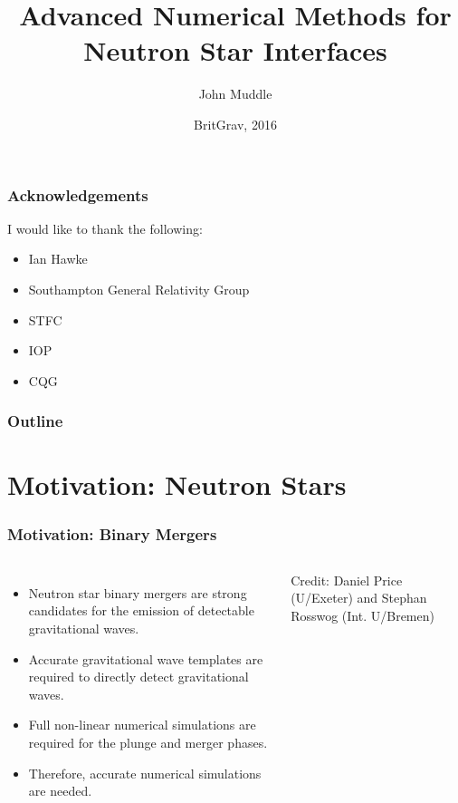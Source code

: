 \documentclass{beamer}
\title[Advanced Numerical Methods for Neutron Star Interfaces] %
{Advanced Numerical Methods for \\
Neutron Star Interfaces}
\subtitle{}
\author[John Muddle - @john$\_$muddle] %
{John Muddle}
\institute[University of Southampton] %
{
  School of Mathematics\\
  University of Southampton\\[1\baselineskip]
  Supervisor - Ian Hawke

}
\date[Britgrav 2016] %
{BritGrav, 2016}
\begin{document}
\begin{frame}
  \titlepage
\end{frame}
\begin{frame}
\frametitle{Acknowledgements}
I would like to thank the following:
\begin{itemize}
\item{Ian Hawke}
\item{Southampton General Relativity Group}
\item{STFC}
\item{IOP}
\item{CQG}
\end{itemize}
\end{frame}
 \begin{frame}
   \frametitle{Outline}
   \tableofcontents
 \end{frame}
\section{Motivation: Neutron Stars}

\begin{frame}
\frametitle{Motivation: Binary Mergers}
\begin{columns}
\begin{itemize}
\item{Neutron star binary mergers are strong candidates for the emission of detectable gravitational waves.}
\item{Accurate gravitational wave templates are required to directly detect gravitational waves.}
\item{Full non-linear numerical simulations are required for the plunge and merger phases.}
\item{Therefore, accurate numerical simulations are needed.}
\end{itemize}
\tiny Credit: Daniel Price (U/Exeter) and Stephan Rosswog (Int. U/Bremen)
\end{columns}
\end{frame}

\end{document}
